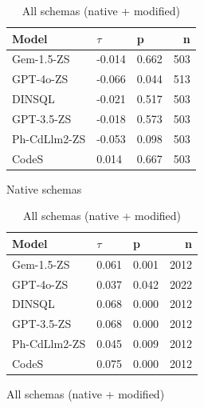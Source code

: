 \begin{table}
  \centering
  \caption{Kendall-Tau ($\tau$) Correlations between \emph{Low Identifier Proportion} and \emph{Query f1}.}
  \begin{subfigure}{.5\linewidth}
      \centering
      \caption{Native schemas}
      \begin{tabular}{lllr}
\toprule
Model & $\tau$ & p & n \\
\midrule
Gem-1.5-ZS & -0.014 & 0.662 & 503 \\
GPT-4o-ZS & -0.066 & 0.044 & 513 \\
DINSQL & -0.021 & 0.517 & 503 \\
GPT-3.5-ZS & -0.018 & 0.573 & 503 \\
Ph-CdLlm2-ZS & -0.053 & 0.098 & 503 \\
CodeS & 0.014 & 0.667 & 503 \\
\bottomrule
\end{tabular}

      \label{table:natmedium-f1-ktau-native}
  \end{subfigure}%
  \begin{subfigure}{.5\linewidth}
      \centering
      \caption{All schemas (native + modified)}
      \begin{tabular}{lllr}
\toprule
Model & $\tau$ & p & n \\
\midrule
Gem-1.5-ZS & 0.061 & 0.001 & 2012 \\
GPT-4o-ZS & 0.037 & 0.042 & 2022 \\
DINSQL & 0.068 & 0.000 & 2012 \\
GPT-3.5-ZS & 0.068 & 0.000 & 2012 \\
Ph-CdLlm2-ZS & 0.045 & 0.009 & 2012 \\
CodeS & 0.075 & 0.000 & 2012 \\
\bottomrule
\end{tabular}

      \label{table:natmedium-f1-ktau-all}
  \end{subfigure}
\end{table}


